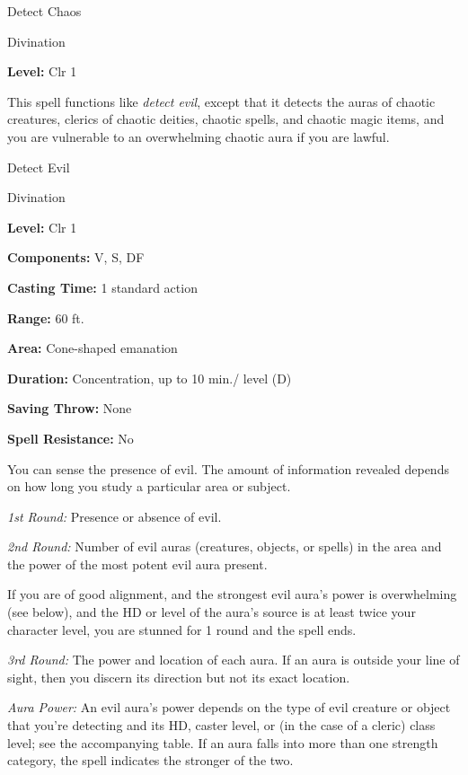 \documentclass{article}
\begin{document}
\vspace{12pt}
Detect Chaos

Divination

\textbf{Level:} Clr 1

This spell functions like \textit{detect evil}, except that it detects the auras 
of chaotic creatures, clerics of chaotic deities, chaotic spells, and chaotic magic 
items, and you are vulnerable to an overwhelming chaotic aura if you are lawful.

\vspace{12pt}
Detect Evil

Divination

\textbf{Level:} Clr 1

\textbf{Components:} V, S, DF

\textbf{Casting Time:} 1 standard action

\textbf{Range:} 60 ft.

\textbf{Area:} Cone-shaped emanation

\textbf{Duration:} Concentration, up to 10 min./ level (D)

\textbf{Saving Throw:} None

\textbf{Spell Resistance:} No

You can sense the presence of evil. The amount of information revealed depends 
on how long you study a particular area or subject.

\textit{1st Round: }Presence or absence of evil.

\textit{2nd Round: }Number of evil auras (creatures, objects, or spells) in the 
area and the power of the most potent evil aura present.

If you are of good alignment, and the strongest evil aura's power is overwhelming 
(see below), and the HD or level of the aura's source is at least twice your character 
level, you are stunned for 1 round and the spell ends.

\textit{3rd Round: }The power and location of each aura. If an aura is outside 
your line of sight, then you discern its direction but not its exact location.

\textit{Aura Power: }An evil aura's power depends on the type of evil creature 
or object that you're detecting and its HD, caster level, or (in the case of a 
cleric) class level; see the accompanying table. If an aura falls into more than 
one strength category, the spell indicates the stronger of the two.
\end{document}
